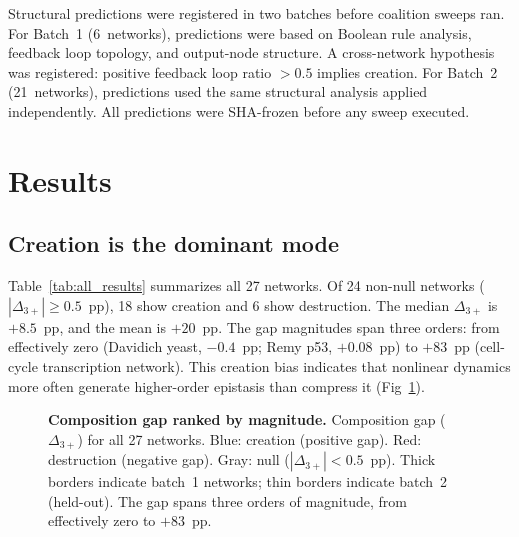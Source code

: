 \documentclass[10pt,letterpaper]{article}
\begin{document}
Structural predictions were registered in two batches before coalition
sweeps ran. For Batch~1 (6~networks), predictions were based on
Boolean rule analysis, feedback loop topology, and output-node
structure. A cross-network hypothesis was registered: positive
feedback loop ratio $> 0.5$ implies creation. For Batch~2
(21~networks), predictions used the same structural analysis applied
independently. All predictions were SHA-frozen before any sweep
executed.


\section*{Results}
\label{sec:results}

\subsection*{Creation is the dominant mode}

Table~\ref{tab:all_results} summarizes all 27 networks. Of 24
non-null networks ($|\Delta_{3+}| \geq 0.5$~pp), 18 show creation
and 6 show destruction. The median $\Delta_{3+}$ is $+8.5$~pp, and
the mean is $+20$~pp. The gap magnitudes span three orders: from
effectively zero (Davidich yeast, $-0.4$~pp; Remy p53, $+0.08$~pp)
to $+83$~pp (cell-cycle transcription network). This creation bias
indicates that nonlinear dynamics more often generate higher-order
epistasis than compress it (Fig~\ref{fig:delta-ranked}).

\begin{figure}[!h]
\caption{{\bf Composition gap ranked by magnitude.}
Composition gap ($\Delta_{3+}$) for all 27 networks.
Blue: creation (positive gap). Red: destruction
(negative gap). Gray: null ($|\Delta_{3+}| < 0.5$~pp). Thick
borders indicate batch~1 networks; thin borders indicate batch~2
(held-out). The gap spans three orders of magnitude, from
effectively zero to $+83$~pp.}
\label{fig:delta-ranked}
\end{figure}
\end{document}
